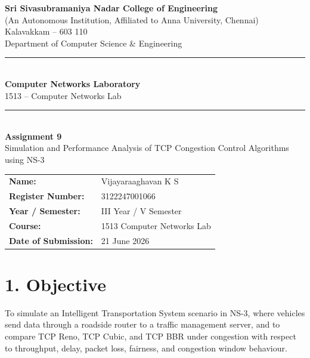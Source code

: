 \documentclass[11pt]{article}
\title{\vspace{-2cm}}
\date{}
\begin{document}
\begin{titlepage}
\centering
\vspace*{1cm}
{\large \textbf{Sri Sivasubramaniya Nadar College of Engineering}}\\
{\small (An Autonomous Institution, Affiliated to Anna University, Chennai)}\\
{\small Kalavakkam -- 603 110}\\[0.3cm]
{\small Department of Computer Science \& Engineering}\\[1.5cm]

\rule{\linewidth}{0.5mm}\\[0.4cm]
{\LARGE \textbf{Computer Networks Laboratory}}\\[0.3cm]
{\Large 1513 -- Computer Networks Lab}\\[0.4cm]
\rule{\linewidth}{0.5mm}\\[1.5cm]

{\huge \textbf{Assignment 9}}\\[0.4cm]
{\Large Simulation and Performance Analysis of TCP Congestion Control Algorithms using NS-3}\\[2cm]

\begin{center}
\begin{tabular}{ll}
\textbf{Name:} & Vijayaraaghavan K S \\[0.2cm]
\textbf{Register Number:} & 3122247001066 \\[0.2cm]
\textbf{Year / Semester:} & III Year / V Semester \\[0.2cm]
\textbf{Course:} & 1513 Computer Networks Lab \\[0.2cm]
\textbf{Date of Submission:} & 21 June 2026 \\[0.2cm]
\end{tabular}
\end{center}

\vfill
\end{titlepage}

\section*{1. Objective}
To simulate an Intelligent Transportation System scenario in NS-3, where
vehicles send data through a roadside router to a traffic management server,
and to compare TCP Reno, TCP Cubic, and TCP BBR under congestion with respect
to throughput, delay, packet loss, fairness, and congestion window behaviour.
\end{document}
